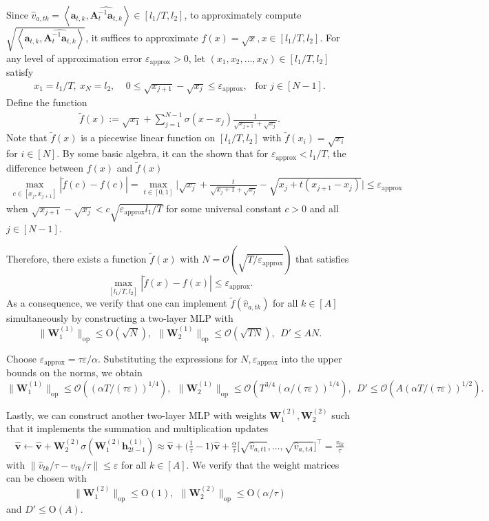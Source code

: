 \documentclass[10pt]{article}
\renewcommand{\hat}{\widehat}
\newcommand{\eps}{\varepsilon}
\newcommand{\lops}[1]{\|{#1}\|_{\mathrm{op}}}
\renewcommand{\cO}{\mathcal{O}}
\newcommand{\<}{\left\langle}
\renewcommand{\>}{\right\rangle}
\newcommand{\lran}{{l_1}}
\newcommand{\uran}{{l_2}}
\newcommand{\appr}{{\mathrm{approx}}}
\newcommand{\temp}{{\tau}}
\newcommand{\hidden}{{D'}}
\newcommand{\conO}{{\mathrm{O}}}
\def\bA{{\mathbf A}}
\def\bW{{\mathbf W}}
\def\ba{{\mathbf a}}
\def\bh{{\mathbf h}}
\def\bv{{\mathbf v}}
\begin{document}
Since $\hat v_{a,tk}=\<\ba_{t,k},\widehat{\bA_t^{-1}\ba_{t,k}}\>\in[\lran/T,\uran]$, to approximately compute $\sqrt{\<\ba_{t,k},\widehat{\bA_t^{-1}\ba_{t,k}}\>}$, it suffices to approximate $f(x)=\sqrt{x},x\in[\lran/T,\uran]$. For any  level of approximation error $\eps_\appr>0$, let $(x_1,x_2,\ldots,x_N)\in[\lran/T,\uran]$ satisfy
\begin{align*}
x_1=\lran/T,~x_N=\uran,   ~~~~~
    0\leq\sqrt{x_{j+1}}-\sqrt{x_{j}}\leq\eps_\appr,~~\text{ for }j\in[N-1].
\end{align*}
Define the function
\begin{align*}
    \tilde f(x):=\sqrt{x_1}+\sum_{j=1}^{N-1}\sigma(x-x_{j})\frac{1}{\sqrt{x_{j+1}}+\sqrt{x_j}}.
\end{align*} Note that $\tilde f(x)$ is a piecewise linear function on $[\lran/T,\uran]$ with $\tilde f(x_i)=\sqrt{x_i}$ for $i\in[N]$. By some basic algebra,  it can the shown that for $\eps_\appr<\lran/T$, the difference between $f(x)$ and $\tilde f(x)$
\begin{align*}
   \max_{c\in[x_j,x_{j+1}]} |\tilde f(c)-f(c)|=\max_{t\in[0,1]}\Big|\sqrt{x_j}+\frac{t}{\sqrt{x_j+1}+\sqrt{x_j}}-\sqrt{x_j+t(x_{j+1}-x_j)}\Big|\leq\eps_\appr
\end{align*} when $\sqrt{x_{j+1}}-\sqrt{x_{j}}<c\sqrt{\eps_\appr\lran/T}$ for some universal constant $c>0$ and all $j\in[N-1]$.

Therefore,
 there exists a function $\tilde f(x)$ with $N=\cO(\sqrt{T/\eps_\appr})$ that satisfies $$\max_{[\lran/T,\uran]}|\tilde f(x)-f(x)|\leq\eps_\appr.$$
 As a consequence, we verify that one can implement $\tilde f(\hat v_{a,tk})$ for all $k\in[A]$ simultaneously  by constructing a two-layer MLP with $$\lops{\bW_1^{(1)}}\leq \conO(\sqrt{N}),~~\lops{\bW_2^{(1)}}\leq \cO(\sqrt{TN}),~~\hidden\leq AN.$$








 Choose $\eps_{\appr}=\temp\eps/\alpha$. Substituting the expressions for $N,\eps_\appr$ into the upper bounds on the norms, we obtain
 $$\lops{\bW_1^{(1)}}\leq \cO(({\alpha T/(\temp\eps)})^{1/4}),~~\lops{\bW_2^{(1)}}\leq \cO(T^{3/4}({\alpha/(\temp\eps)})^{1/4}),~~\hidden\leq \cO(A({\alpha T/(\temp\eps)})^{1/2}).$$


 Lastly, we can construct another two-layer MLP with weights $\bW^{(2)}_1,\bW^{(2)}_2$ such that it implements the summation and multiplication updates
 \begin{align*}
 \hat\bv\leftarrow\hat\bv+\bW^{(2)}_2\sigma(\bW^{(2)}_1\bh_{2t-1}^{(1)})\approx\hat\bv+\Big(\frac1\temp-1\Big)\hat\bv+\frac\alpha\temp\Big[\sqrt{ \hat v_{a,t1}},\ldots,\sqrt{ \hat v_{a,tA}}\Big]^\top=\frac{\hat v_{tk}}{\temp}
 \end{align*}
with $\|\hat v_{tk}/\temp-v_{tk}/\temp\|\leq \eps$ for all $k\in[A]$. We verify that the weight matrices can be chosen with
  $$
 \lops{\bW^{(2)}_1}\leq \conO(1),~~ \lops{\bW^{(2)}_2}\leq \conO(\alpha/\temp)
 $$ and $\hidden\leq \conO(A)$.
\end{document}
